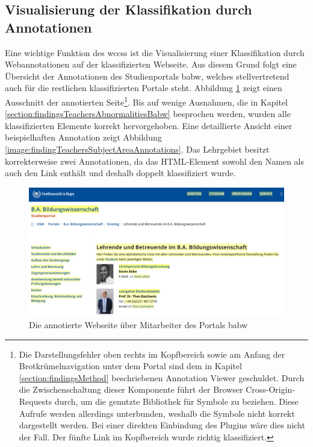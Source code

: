 \subsection{Visualisierung der Klassifikation durch Annotationen}
    Eine wichtige Funktion des \glspl{wccs}
    ist die Visualisierung einer Klassifikation durch Webannotationen
    auf der klassifizierten Webseite.
    Aus diesem Grund folgt eine Übersicht der Annotationen
    des Studienportals \gls{babw},
    welches stellvertretend auch für die restlichen klassifizierten Portale steht.
    Abbildung \ref{image:findingTeachersAnnotationsOverview}
    zeigt einen Ausschnitt der annotierten
    Seite\footnote{Die Darstellungsfehler oben rechts im Kopfbereich
    sowie am Anfang der Brotkrümelnavigation unter dem Portal
    sind dem in Kapitel \ref{section:findingsMethod} beschriebenen
    Annotation Viewer geschuldet.
    Durch die Zwischenschaltung dieser Komponente
    führt der Browser Cross-Origin-Requests durch,
    um die genutzte Bibliothek für Symbole zu beziehen.
    Diese Aufrufe werden allerdings unterbunden,
    weshalb die Symbole nicht korrekt dargestellt werden.
    Bei einer direkten Einbindung des Plugins wäre dies nicht der Fall.
    Der fünfte Link im Kopfbereich wurde richtig klassifiziert.}.
    Bis auf wenige Ausnahmen, die in
    Kapitel \ref{section:findingsTeachersAbnormalitiesBabw} besprochen werden,
    wurden alle klassifizierten Elemente korrekt hervorgehoben.
    Eine detaillierte Ansicht einer beispielhaften Annotation zeigt
    Abbildung \ref{image:findingTeachersSubjectAreaAnnotations}.
    Das Lehrgebiet besitzt korrekterweise zwei Annotationen,
    da das HTML-Element sowohl den Namen als auch den Link enthält
    und deshalb doppelt klassifiziert wurde.

    \begin{figure}[htb]
        \centering
        \includegraphics[width=\textwidth]{../resources/findings/case-study-1/babw/annotations/overview.png}
        \caption{Die annotierte Webseite über Mitarbeiter des Portals \acrshort{babw}}
        \label{image:findingTeachersAnnotationsOverview}
    \end{figure}

